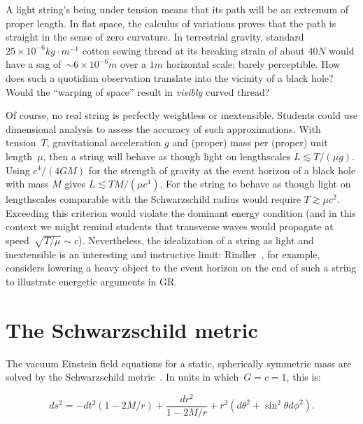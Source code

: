 \documentclass[review]{elsarticle}
\begin{document}
A light string's being under tension means that its path will be an
extremum of proper length.  In flat space, the calculus of variations
proves that the path is straight in the sense of zero curvature.  In
terrestrial gravity, standard $25\times
10^{-6}\unit{kg}\cdot\unit{m}^{-1}$ cotton sewing thread at its breaking
strain of about $40\unit{N}$ would have a sag of~$\sim 6\times
10^{-6}\unit{m}$ over a $1\unit{m}$ horizontal scale: barely perceptible.
How does such a quotidian observation translate into the vicinity of a
black hole?  Would the ``warping of space'' result in {\em visibly}
curved thread?

Of course, no real string is perfectly weightless or inextensible.
Students could use dimensional analysis to assess the accuracy of such
approximations.  With tension~$T$, gravitational acceleration $g$ and
(proper) mass per (proper) unit length~$\mu$, then a string will
behave as though light on lengthscales $L\lesssim T/\left(\mu
g\right)$.  Using $c^4/\left(4GM\right)$ for the strength of gravity
at the event horizon of a black hole with mass $M$ gives $L\lesssim
TM/\left(\mu c^4\right)$.  For the string to behave as though light on
lengthscales comparable with the Schwarzschild radius would require
$T\gtrsim\mu c^2$.  Exceeding this criterion would violate the
dominant energy condition (and in this context we might remind
students that transverse waves would propagate at
speed~$\sqrt{T/\mu}\sim c$).  Nevertheless, the idealization of a
string as light and inextensible is an interesting and instructive
limit: Rindler~\cite{rindler}, for example, considers lowering a heavy
object to the event horizon on the end of such a string to illustrate
energetic arguments in GR.

\section{The Schwarzschild metric}

The vacuum Einstein field equations for a static, spherically
symmetric mass are solved by the Schwarzschild
metric~\cite{schwarzschild1916}.  In units in which~$G=c=1$, this is:

\begin{equation}\label{schwarzschild}
ds^2= -dt^2\left(1-2M/r\right) +\frac{dr^2}{1-2M/r} + r^2\left(d\theta^2 + \sin^2\theta d\phi^2\right).
\end{equation}
\end{document}
